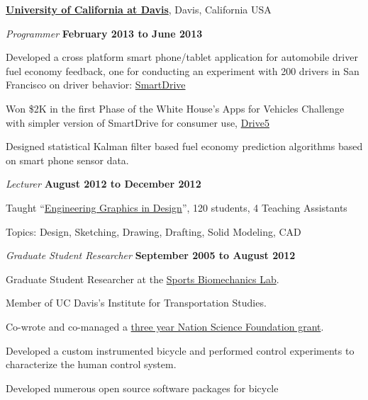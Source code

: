 \documentclass[10pt]{article}
\newenvironment{outerlist}[1][\enskip\textbullet]%
        {\begin{itemize}[#1]}{\end{itemize}%
         \vspace{-.6\baselineskip}}
\newenvironment{innerlist}[1][\enskip\textbullet]%
        {\begin{compactitem}[#1]}{\end{compactitem}}
\newcommand{\blankline}{\quad\pagebreak[2]}
\begin{document}
\blankline

\href{http://www.ucdavis.edu}{\textbf{University of California at Davis}}, Davis, California USA
\begin{outerlist}
  \item[] \textit{Programmer}%
        \hfill \textbf{February 2013 to June 2013}
  \begin{innerlist}
    \item Developed a cross platform smart phone/tablet application for
      automobile driver fuel economy feedback, one for conducting an experiment
      with 200 drivers in San Francisco on driver behavior:
      \href{http://smartdrive.ucdavis.edu}{SmartDrive}
    \item Won \$2K in the first Phase of the White House's Apps for Vehicles
      Challenge with simpler version of SmartDrive for consumer use,
      \href{http://drive5.us}{Drive5}
    \item Designed statistical Kalman filter based fuel economy prediction
      algorithms based on smart phone sensor data.
  \end{innerlist}
  \item[] \textit{Lecturer}%
        \hfill \textbf{August 2012 to December 2012}
  \begin{innerlist}
  \item Taught
    ``\href{http://mae.ucdavis.edu/~biosport/jkm/courses/eng4/}{Engineering
    Graphics in Design}'', 120 students, 4 Teaching Assistants
    \item Topics: Design, Sketching, Drawing, Drafting, Solid Modeling, CAD
  \end{innerlist}
  \item[] \textit{Graduate Student Researcher}%
        \hfill \textbf{September 2005 to August 2012}
  \begin{innerlist}
    \item Graduate Student Researcher at the
      \href{http://biosport.ucdavis.edu}{Sports Biomechanics Lab}.
    \item Member of UC Davis's Institute for Transportation Studies.
    \item Co-wrote and co-managed a
        \href{http://nsf.gov/awardsearch/showAward.do?AwardNumber=0928339}{three year
        Nation Science Foundation grant}.
    \item Developed a custom instrumented bicycle and performed control
        experiments to characterize the human control system.
    \item Developed numerous open source software packages for bicycle

\end{innerlist}
\end{outerlist}
\end{document}
